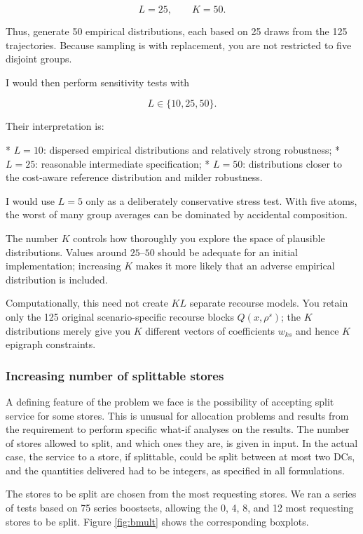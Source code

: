 \documentclass[mnsc,sglanonrev]{informs4}  %
\theoremstyle{remark}\newtheorem{remark}{Remark}
\begin{document}
$$
L=25,\qquad K=50.
$$

Thus, generate 50 empirical distributions, each based on 25 draws from the 125 trajectories. Because sampling is with replacement, you are not restricted to five disjoint groups.

I would then perform sensitivity tests with

$$
L\in\{10,25,50\}.
$$

Their interpretation is:

* \(L=10\): dispersed empirical distributions and relatively strong robustness;
* \(L=25\): reasonable intermediate specification;
* \(L=50\): distributions closer to the cost-aware reference distribution and milder robustness.

I would use \(L=5\) only as a deliberately conservative stress test. With five atoms, the worst of many group averages can be dominated by accidental composition.

The number \(K\) controls how thoroughly you explore the space of plausible distributions. Values around \(25\)–\(50\) should be adequate for an initial implementation; increasing \(K\) makes it more likely that an adverse empirical distribution is included.

Computationally, this need not create \(K L\) separate recourse models. You retain only the 125 original scenario-specific recourse blocks \(Q(x,\rho^s)\); the \(K\) distributions merely give you \(K\) different vectors of coefficients \(w_{ks}\) and hence \(K\) epigraph constraints.


\subsubsection*{Increasing number of splittable stores}

A defining feature of the problem we face is the possibility of accepting split service for some stores. This is unusual for allocation problems and results from the requirement to perform specific what-if analyses on the results. The number of stores allowed to split, and which ones they are, is given in input. In the actual case, the service to a store, if splittable, could be split between at most two DCs, and the quantities delivered had to be integers, as specified in all formulations.

The stores to be split are chosen from the most requesting stores. We ran a series of tests based on 75 series boostsets, allowing the 0, 4, 8, and 12 most requesting stores to be split. Figure \ref{fig:bmult} shows the corresponding boxplots.
\end{document}
